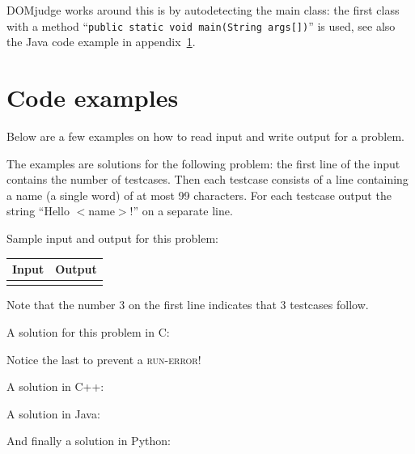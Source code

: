 DOMjudge works around this is by autodetecting the main class: the
first class with a method
``\verb!public static void main(String args[])!'' is used, see also
the Java code example in appendix~\ref{codeexamples}.

\newpage
\appendix

\section{Code examples}\label{codeexamples}

Below are a few examples on how to read input and write output for a
problem.

The examples are solutions for the following problem: the first line
of the input contains the number of testcases. Then each testcase
consists of a line containing a name (a single word) of at most 99
characters. For each testcase output the string ``Hello $<$name$>$!''
on a separate line.

Sample input and output for this problem:

\begin{tabular}{|p{}|p{}|}
\hline
\textbf{Input} & \textbf{Output} \\
\hline
 &
 \\
\hline
\end{tabular}

Note that the number 3 on the first line indicates that 3 testcases
follow.

A solution for this problem in C:

Notice the last  to prevent a \textsc{run-error}!

\newpage

A solution in C++:

A solution in Java:

\newpage

And finally a solution in Python:


